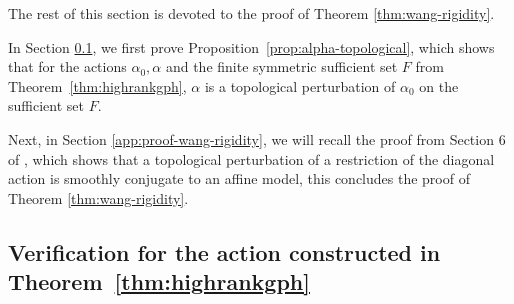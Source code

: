 \documentclass[11pt]{amsart}
\numberwithin{equation}{section}
\theoremstyle{plain}
\begin{document}
\setcounter{thm}{1}
The rest of this section is devoted to the proof of Theorem \ref{thm:wang-rigidity}.

In Section \ref{app:verify-topological-perturbation}, we first prove Proposition~\ref{prop:alpha-topological}, which shows that for the actions $\alpha_0,\alpha$ and the finite symmetric sufficient set $F$ from
Theorem~\ref{thm:highrankgph}, $\alpha$ is a topological perturbation of $\alpha_0$ on the sufficient set $F$. 

Next, in Section \ref{app:proof-wang-rigidity}, we will recall the proof from Section 6 of \cite{Wang26}, which shows that a topological perturbation of a restriction of the diagonal action is smoothly conjugate to an affine model, this concludes the proof of Theorem \ref{thm:wang-rigidity}.

\subsection{Verification for the action constructed in
Theorem~\ref{thm:highrankgph}}
\label{app:verify-topological-perturbation}
\end{document}
